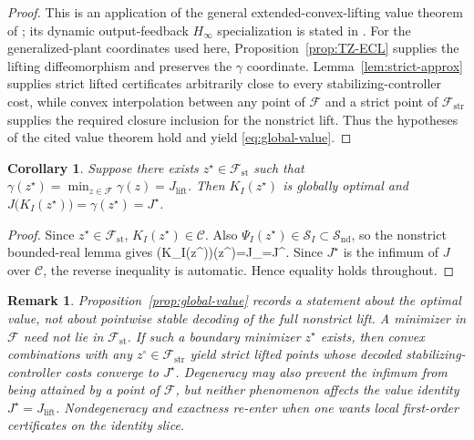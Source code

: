 \documentclass[letterpaper,10pt,conference]{ieeeconf}
\def\[#1\]{\begin{align*}#1\end{align*}}
\providecommand{\cC}{\mathcal{C}}
\providecommand{\cF}{\mathcal{F}}
\providecommand{\cS}{\mathcal{S}}
\renewcommand{\^}[1]{^{(#1)}}
\newtheorem{corollary}[theorem]{Corollary}
\newtheorem{remark}[theorem]{Remark}
\begin{document}
\begin{proof}
This is an application of the general extended-convex-lifting value theorem of \citet[Theorem~2.1]{zheng2025extended}; its dynamic output-feedback $H_\infty$ specialization is stated in \citet[Corollary~4.1]{zheng2025extended}. For the generalized-plant coordinates used here, Proposition~\ref{prop:TZ-ECL} supplies the lifting diffeomorphism and preserves the $\gamma$ coordinate. Lemma~\ref{lem:strict-approx} supplies strict lifted certificates arbitrarily close to every stabilizing-controller cost, while convex interpolation between any point of $\cF$ and a strict point of $\cF_{\mathrm{str}}$ supplies the required closure inclusion for the nonstrict lift. Thus the hypotheses of the cited value theorem hold and yield \eqref{eq:global-value}.
\end{proof}

\begin{corollary}\label{cor:lift-attain}
Suppose there exists $z^\star\in\cF_{\mathrm{st}}$ such that $
\gamma(z^\star)=\min_{z\in\cF}\gamma(z)=J_{\mathrm{lift}}$. Then $K_I(z^\star)$ is globally optimal and $
J\bigl(K_I(z^\star)\bigr)=\gamma(z^\star)=J^\star$.
\end{corollary}

\begin{proof}
Since $z^\star\in\cF_{\mathrm{st}}$, $K_I(z^\star)\in\cC$. Also $\Psi_I(z^\star)\in\cS_I\subset\cS_{\mathrm{nd}}$, so the nonstrict bounded-real lemma gives
\[
J\bigl(K_I(z^\star)\bigr)\le \gamma(z^\star)=J_{}=J^\star.
\]
Since $J^\star$ is the infimum of $J$ over $\cC$, the reverse inequality is automatic. Hence equality holds throughout.
\end{proof}

\vspace{-0.1cm}
\begin{remark}\label{rem:attain}
Proposition~\ref{prop:global-value} records a statement about the optimal value, not about pointwise stable decoding of the full nonstrict lift. A minimizer in $\cF$ need not lie in $\cF_{\mathrm{st}}$. If such a boundary minimizer $z^\star$ exists, then convex combinations with any $z^\circ\in\cF_{\mathrm{str}}$ yield strict lifted points whose decoded stabilizing-controller costs converge to $J^\star$. Degeneracy may also prevent the infimum from being attained by a point of $\cF$, but neither phenomenon affects the value identity $J^\star=J_{\mathrm{lift}}$. Nondegeneracy and exactness re-enter when one wants local first-order certificates on the identity slice.
\end{remark}
\end{document}
